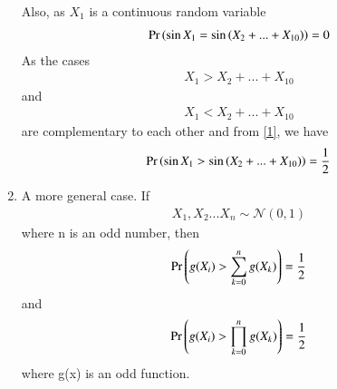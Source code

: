 \documentclass[journal,12pt,twocolumn]{IEEEtran}
\begin{document}
\begin{enumerate}[label = (\Alph*)]
    Also, as $X_1$ is a continuous random variable
    \begin{align}
       \Pr\left(\sin{X_1}=\sin{(X_2+...+X_{10})}\right)=0
    \end{align}
     As the cases
     \begin{align}
      {X_1>X_2+...+X_{10}}   
     \end{align}and 
     \begin{align}
         {X_1<X_2+...+X_{10}}
     \end{align}are complementary to each other and from \eqref{1}, we have 
        \begin{align}
         \Pr\left(\sin{X_1}>\sin{(X_2+...+X_{10}})\right)=\frac{1}{2}   
        \end{align}

\item A more general case.
If 
\begin{align}
 X_1,X_2...X_n \sim \mathcal{N}(0,1)   
\end{align}
where n is an odd number, then
\begin{align}
    \Pr\left(g(X_i)>\sum_{k=0}^ng(X_k)\right)=\frac{1}{2}
\end{align}
and
\begin{align}
    \Pr\left(g(X_i)>\prod_{k=0}^ng(X_k)\right)=\frac{1}{2}
\end{align}
where g(x) is an odd function.
\end{enumerate}
\end{document}
